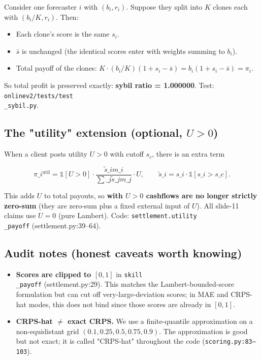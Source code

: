 \documentclass[11pt]{article}
\begin{document}
Consider one forecaster $i$ with $(b_i, r_i)$. Suppose they split into $K$ clones each with $(b_i/K, r_i)$. Then:

\begin{itemize}
\item Each clone's score is the same $s_i$.
\item $\bar s$ is unchanged (the identical scores enter with weights summing to $b_i$).
\item Total payoff of the clones: $K \cdot (b_i/K)(1 + s_i - \bar s) = b_i(1 + s_i - \bar s) = \pi_i$.
\end{itemize}

So total profit is preserved exactly: \textbf{sybil ratio = 1.000000}. Test: \texttt{onlinev2/tests/test\\_sybil.py}.

\subsection{The "utility" extension (optional, $U > 0$)}


When a client posts utility $U > 0$ with cutoff $s_c$, there is an extra term

$$
\pi\_i^{\text{util}} = \mathbb 1[U > 0] \cdot \frac{\tilde s\_i m\_i}{\sum\_j \tilde s\_j m\_j} \cdot U,\qquad \tilde s\_i = s\_i \cdot \mathbb 1[s\_i > s\_c].
$$

This adds $U$ to total payouts, so \textbf{with $U > 0$ cashflows are no longer strictly zero-sum} (they are zero-sum plus a fixed external input of $U$). All slide-11 claims use $U = 0$ (pure Lambert). Code: \texttt{settlement.utility\\_payoff} (settlement.py:39--64).

\subsection{Audit notes (honest caveats worth knowing)}


\begin{itemize}
\item \textbf{Scores are clipped to $[0,1]$} in \texttt{skill\\_payoff} (settlement.py:29). This matches the Lambert-bounded-score formulation but can cut off very-large-deviation scores; in MAE and CRPS-hat modes, this does not bind since those scores are already in $[0,1]$.
\item \textbf{CRPS-hat $\ne$ exact CRPS.} We use a finite-quantile approximation on a non-equidistant grid $(0.1, 0.25, 0.5, 0.75, 0.9)$. The approximation is good but not exact; it is called "CRPS-hat" throughout the code (\texttt{scoring.py:83--103}).
\end{itemize}
\end{document}

